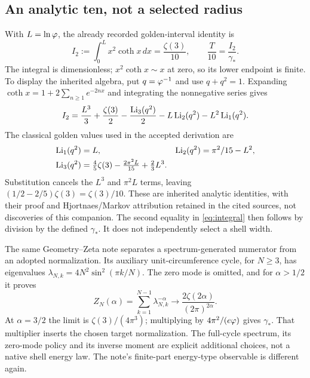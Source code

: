 \subsection{An analytic ten, not a selected radius}
With $L=\ln\varphi$, the already recorded golden-interval identity is
\begin{equation}\label{eq:integral}
I_2:=\int_0^L x^2\coth x\,dx=\frac{\zeta(3)}{10},
\qquad \frac{T}{10}=\frac{I_2}{\gamma_*}.
\end{equation}
The integral is dimensionless; $x^2\coth x\sim x$ at zero, so its lower endpoint is finite. To display the inherited algebra, put $q=\varphi^{-1}$ and use $q+q^2=1$. Expanding $\coth x=1+2\sum_{n\geq1}e^{-2nx}$ and integrating the nonnegative series gives
\begin{equation}\label{eq:polylog}
I_2=\frac{L^3}{3}+\frac{\zeta(3)}2
-\frac{\operatorname{Li}_3(q^2)}2-L\operatorname{Li}_2(q^2)-L^2\operatorname{Li}_1(q^2).
\end{equation}
The classical golden values used in the accepted derivation are
\begin{align}
\operatorname{Li}_1(q^2)&=L,&\operatorname{Li}_2(q^2)&=\pi^2/15-L^2,\notag\\
\operatorname{Li}_3(q^2)&=\tfrac45\zeta(3)-\tfrac{2\pi^2L}{15}+\tfrac23L^3.\label{eq:golden-polylogs}
\end{align}
Substitution cancels the $L^3$ and $\pi^2L$ terms, leaving $(1/2-2/5)\zeta(3)=\zeta(3)/10$. These are inherited analytic identities, with their proof and Hjortnaes/Markov attribution retained in the cited sources, not discoveries of this companion. The second equality in \eqref{eq:integral} then follows by division by the defined $\gamma_*$. It does not independently select a shell width.~\cite[Sec.~7]{GZ}~\cite[App.~E, printed pp.~24--25]{SP}

The same Geometry--Zeta note separates a spectrum-generated numerator from an adopted normalization. Its auxiliary unit-circumference cycle, for $N\geq3$, has eigenvalues $\lambda_{N,k}=4N^2\sin^2(\pi k/N)$. The zero mode is omitted, and for $\alpha>1/2$ it proves
\begin{equation}\label{eq:spectrum}
Z_N(\alpha)=\sum_{k=1}^{N-1}\lambda_{N,k}^{-\alpha}
\longrightarrow\frac{2\zeta(2\alpha)}{(2\pi)^{2\alpha}}.
\end{equation}
At $\alpha=3/2$ the limit is $\zeta(3)/(4\pi^3)$; multiplying by $4\pi^2/(e\varphi)$ gives $\gamma_*$. That multiplier inserts the chosen target normalization. The full-cycle spectrum, its zero-mode policy and its inverse moment are explicit additional choices, not a native shell energy law. The note's finite-part energy-type observable is different again.~\cite[Secs.~3--6]{GZ}

